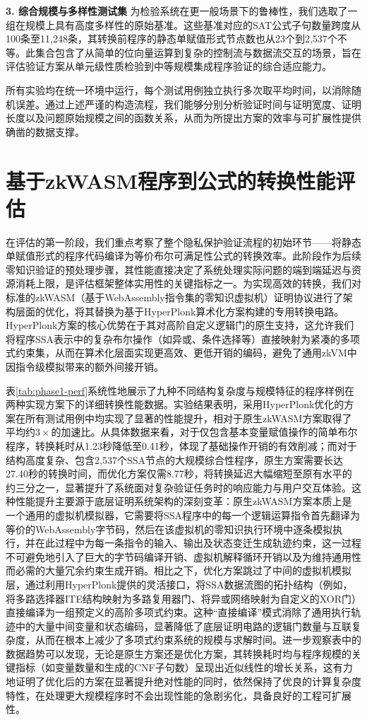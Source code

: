 \textbf{3. 综合规模与多样性测试集}
为检验系统在更一般场景下的鲁棒性，我们选取了一组在规模上具有高度多样性的原始基准。这些基准对应的SAT公式子句数量跨度从100条至11,248条，其转换前程序的静态单赋值形式节点数也从23个到2,537个不等。此集合包含了从简单的位向量运算到复杂的控制流与数据流交互的场景，旨在评估验证方案从单元级性质检验到中等规模集成程序验证的综合适应能力。

所有实验均在统一环境中运行，每个测试用例独立执行多次取平均时间，以消除随机误差。通过上述严谨的构造流程，我们能够分别分析验证时间与证明宽度、证明长度以及问题原始规模之间的函数关系，从而为所提出方案的效率与可扩展性提供确凿的数据支撑。

\section{基于zkWASM程序到公式的转换性能评估}

在评估的第一阶段，我们重点考察了整个隐私保护验证流程的初始环节——将静态单赋值形式的程序代码编译为等价布尔可满足性公式的转换效率。此阶段作为后续零知识验证的预处理步骤，其性能直接决定了系统处理实际问题的端到端延迟与资源消耗上限，是评估框架整体实用性的关键指标之一。为实现高效的转换，我们对标准的zkWASM（基于WebAssembly指令集的零知识虚拟机）证明协议进行了架构层面的优化，将其替换为基于HyperPlonk算术化方案构建的专用转换电路。HyperPlonk方案的核心优势在于其对高阶自定义逻辑门的原生支持，这允许我们将程序SSA表示中的复杂布尔操作（如异或、条件选择等）直接映射为紧凑的多项式约束集，从而在算术化层面实现更高效、更低开销的编码，避免了通用zkVM中因指令级模拟带来的额外间接开销。

表\ref{tab:phase1-perf}系统性地展示了九种不同结构复杂度与规模特征的程序样例在两种实现方案下的详细转换性能数据。实验结果表明，采用HyperPlonk优化的方案在所有测试用例中均实现了显著的性能提升，相对于原生zkWASM方案取得了平均约$3\times$的加速比。从具体数据来看，对于仅包含基本变量赋值操作的简单布尔程序，转换耗时从1.23秒降低至0.41秒，体现了基础操作开销的有效削减；而对于结构高度复杂、包含2,537个SSA节点的大规模综合性程序，原生方案需要长达27.40秒的转换时间，而优化方案仅需8.77秒，将转换延迟大幅缩短至原有水平的约三分之一，显著提升了系统面对复杂验证任务时的响应能力与用户交互体验。这种性能提升主要源于底层证明系统架构的深刻变革：原生zkWASM方案本质上是一个通用的虚拟机模拟器，它需要将SSA程序中的每一个逻辑运算指令首先翻译为等价的WebAssembly字节码，然后在该虚拟机的零知识执行环境中逐条模拟执行，并在此过程中为每一条指令的输入、输出及状态变迁生成轨迹约束，这一过程不可避免地引入了巨大的字节码编译开销、虚拟机解释循环开销以及为维持通用性而必需的大量冗余约束生成开销。相比之下，优化方案跳过了中间的虚拟机模拟层，通过利用HyperPlonk提供的灵活接口，将SSA数据流图的拓扑结构（例如，将多路选择器ITE结构映射为多路复用器门、将异或网络映射为自定义的XOR门）直接编译为一组预定义的高阶多项式约束。这种“直接编译”模式消除了通用执行轨迹中的大量中间变量和状态编码，显著降低了底层证明电路的逻辑门数量与互联复杂度，从而在根本上减少了多项式约束系统的规模与求解时间。进一步观察表中的数据趋势可以发现，无论是原生方案还是优化方案，其转换耗时均与程序规模的关键指标（如变量数量和生成的CNF子句数）呈现出近似线性的增长关系，这有力地证明了优化后的方案在显著提升绝对性能的同时，依然保持了优良的计算复杂度特性，在处理更大规模程序时不会出现性能的急剧劣化，具备良好的工程可扩展性。

